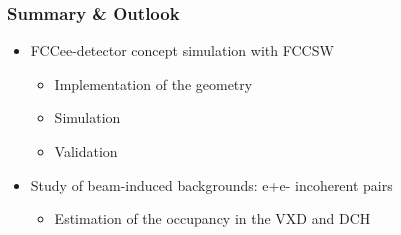 \documentclass[hyperref={colorlinks=true,pdfpagelabels=false,linkcolor=black}, xcolor=dvipsnames,10pt]{beamer}
\begin{document}
\label{lastslide}
\begin{frame}
  \frametitle{Summary \& Outlook}
  
	\begin{itemize}
	 \item FCCee-detector concept simulation with FCCSW \vspace{0.2cm}
	 	\begin{itemize}
	  	\item Implementation of the geometry \vspace{0.2cm}
	  	\item Simulation \vspace{0.2cm}
	  	\item Validation \vspace{0.5cm}
	  	\end{itemize}
	\item Study of beam-induced backgrounds: e+e- incoherent pairs \vspace{0.2cm}
		\begin{itemize}
	  	\item Estimation of the occupancy in the VXD and DCH
	  	\end{itemize}
  \end{itemize}

\end{frame}
\end{document}
